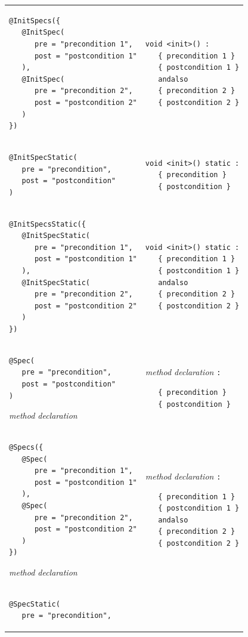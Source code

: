 \documentclass{article}
\begin{document}
\begin{longtable}{ m{7cm} | m{5cm} }
\begin{verbatim}
@InitSpecs({
   @InitSpec(
      pre = "precondition 1", 
      post = "postcondition 1"
   ),
   @InitSpec(
      pre = "precondition 2",
      post = "postcondition 2"
   )
})
\end{verbatim}
&
\begin{verbatim}
void <init>() :
   { precondition 1 }
   { postcondition 1 }
   andalso
   { precondition 2 }
   { postcondition 2 }
\end{verbatim}
\\
\begin{verbatim}
@InitSpecStatic(
   pre = "precondition",
   post = "postcondition"
)
\end{verbatim}
&
\begin{verbatim}
void <init>() static :
   { precondition }
   { postcondition }
\end{verbatim}
\\
\begin{verbatim}
@InitSpecsStatic({
   @InitSpecStatic(
      pre = "precondition 1", 
      post = "postcondition 1"
   ),
   @InitSpecStatic(
      pre = "precondition 2",
      post = "postcondition 2"
   )
})
\end{verbatim}
&
\begin{verbatim}
void <init>() static :
   { precondition 1 }
   { postcondition 1 }
   andalso
   { precondition 2 }
   { postcondition 2 }
\end{verbatim}
\\
\begin{verbatim}
@Spec(
   pre = "precondition", 
   post = "postcondition"
)
\end{verbatim}
\it{method declaration}
&
{\it method declaration} \texttt{:}
\begin{verbatim}
   { precondition }
   { postcondition }
\end{verbatim}
\\
\begin{verbatim}
@Specs({
   @Spec(
      pre = "precondition 1", 
      post = "postcondition 1"
   ),
   @Spec(
      pre = "precondition 2", 
      post = "postcondition 2"
   )
})
\end{verbatim}
\it{method declaration}
&
{\it method declaration} \texttt{:}
\begin{verbatim}
   { precondition 1 }
   { postcondition 1 }
   andalso
   { precondition 2 }
   { postcondition 2 }
\end{verbatim}
\\
\begin{verbatim}
@SpecStatic(
   pre = "precondition", 

\end{verbatim}
\end{longtable}
\end{document}
